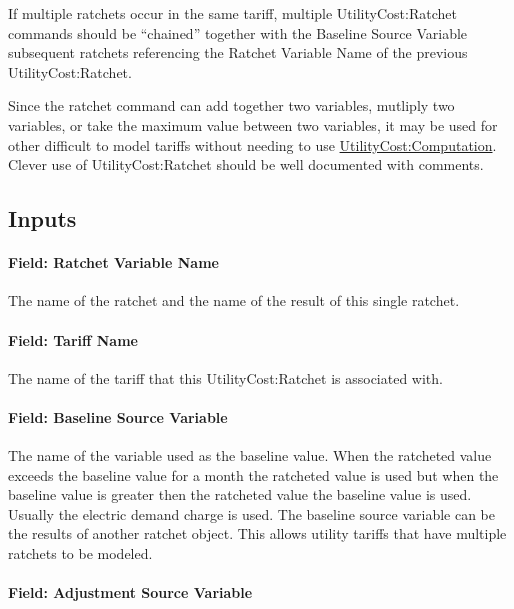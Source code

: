 If multiple ratchets occur in the same tariff, multiple UtilityCost:Ratchet commands should be ``chained'' together with the Baseline Source Variable subsequent ratchets referencing the Ratchet Variable Name of the previous UtilityCost:Ratchet.

Since the ratchet command can add together two variables, mutliply two variables, or take the maximum value between two variables, it may be used for other difficult to model tariffs without needing to use \hyperref[utilitycostcomputation]{UtilityCost:Computation}. Clever use of UtilityCost:Ratchet should be well documented with comments.

\subsection{Inputs}\label{inputs-071}

\paragraph{Field: Ratchet Variable Name}\label{field-ratchet-variable-name}

The name of the ratchet and the name of the result of this single ratchet.

\paragraph{Field: Tariff Name}\label{field-tariff-name-003}

The name of the tariff that this UtilityCost:Ratchet is associated with.

\paragraph{Field: Baseline Source Variable}\label{field-baseline-source-variable}

The name of the variable used as the baseline value. When the ratcheted value exceeds the baseline value for a month the ratcheted value is used but when the baseline value is greater then the ratcheted value the baseline value is used. Usually the electric demand charge is used. The baseline source variable can be the results of another ratchet object. This allows utility tariffs that have multiple ratchets to be modeled.

\paragraph{Field: Adjustment Source Variable}\label{field-adjustment-source-variable}

